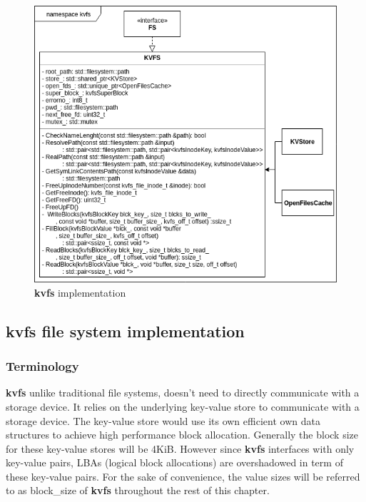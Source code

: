 \documentclass[bsc,frontabs,twoside,singlespacing,parskip,deptreport]{infthesis}     %
\begin{document}
{\begin{figure}[h!]
	\centering
	\includegraphics[scale=0.6]{diagrams/kvfs_filesystem_impl.png}
	\caption{{\bf kvfs} implementation}
	 \label{fig:kvfs_fs_impl}
\end{figure}

\subsection{kvfs file system implementation}

\subsubsection{Terminology}
{\bf kvfs} unlike traditional file systems, doesn't need to directly communicate with a storage device. It relies on the underlying key-value store to communicate with a storage device. The key-value store would use its own efficient own data structures to achieve high performance block allocation. Generally the block size for these key-value stores will be 4KiB. However since {\bf kvfs} interfaces with only key-value pairs, LBAs (logical block allocations) are overshadowed in term of these key-value pairs. For the sake of convenience, the value sizes will be referred to as block\_size of {\bf kvfs} throughout the rest of this chapter.

}
\end{document}
